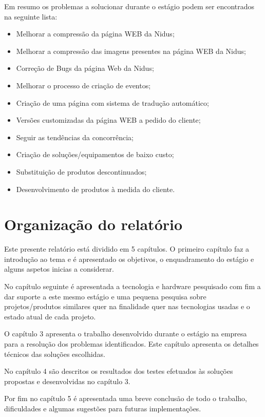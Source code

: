 \par
Em resumo os problemas a solucionar durante o estágio podem ser encontrados na seguinte lista:
\begin{itemize}
\item Melhorar a compressão da página WEB da Nidus;
\item Melhorar a compressão das imagens presentes na página WEB da Nidus;
\item Correção de Bugs da página Web da Nidus;
\item Melhorar o processo de criação de eventos;
\item Criação de uma página com sistema de tradução automático;
\item Versões customizadas da página WEB a pedido do cliente;
\item Seguir as tendências da concorrência;
\item Criação de soluções/equipamentos de baixo custo;
\item Substituição de produtos descontinuados;
\item Desenvolvimento de produtos à medida do cliente.

\end{itemize}

\section{Organização do relatório}

\par Este presente relatório está dividido em 5 capítulos. O primeiro capítulo faz a introdução ao tema e é apresentado os objetivos, o enquadramento do estágio e alguns aspetos inicias a considerar. 
\par No capítulo seguinte é apresentada a tecnologia e hardware pesquisado com fim a dar suporte a este mesmo estágio e uma pequena pesquisa sobre projetos/produtos similares quer na finalidade quer nas tecnologias usadas e o estado atual de cada projeto. 
\par O capítulo 3 apresenta o trabalho desenvolvido durante o estágio na empresa para a resolução dos problemas identificados. Este capítulo apresenta os detalhes técnicos das soluções escolhidas. 
\par No capítulo 4 são descritos os resultados dos testes efetuados às soluções propostas e desenvolvidas no capítulo 3.
\par Por fim no capítulo 5 é apresentada uma breve conclusão de todo o trabalho, dificuldades e algumas sugestões para futuras implementações. 

